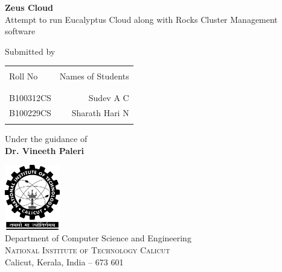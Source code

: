 \begin{titlepage}

\begin{center}



\Large \textbf {Zeus Cloud}\\[0.5in]
Attempt to run Eucalyptus Cloud along with Rocks Cluster Management software
        \vspace{.2in}

\normalsize Submitted by \\
\begin{table}[h]
\centering
\begin{tabular}{lr}\hline \\
Roll No & Names of Students \\ \\ \hline
\\
B100312CS & Sudev A C \\
B100229CS & Sharath Hari N \\ 
 \\ \hline 
\end{tabular}
\end{table}

\vspace{.1in}
Under the guidance of\\
{\textbf{Dr. Vineeth Paleri}}\\[0.2in]

\vfill

\includegraphics[width=0.18\textwidth]{./nitc-logo}\\[0.1in]
\Large{Department of Computer Science and Engineering}\\
\normalsize
\textsc{National Institute of Technology Calicut}\\
Calicut, Kerala, India -- 673 601 \\
\vspace{0.2cm}


\end{center}

\end{titlepage}
